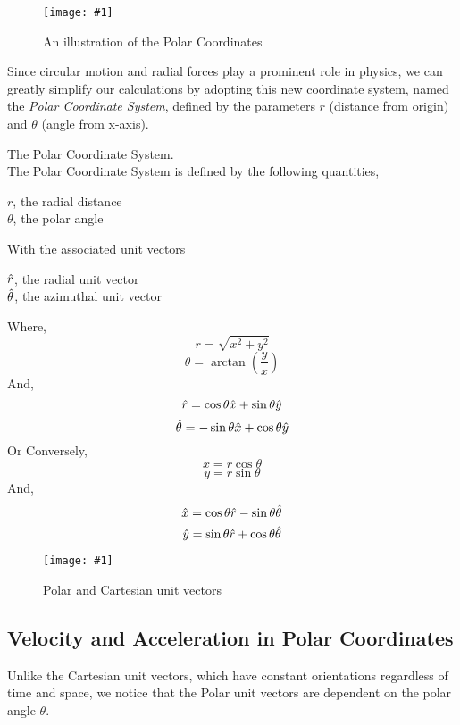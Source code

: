\documentclass[11pt]{article}
\newcommand{\fig}[4]{
    \begin{figure}[H]
        \centering
        \texttt{[image: \#1]}
        \caption{#2}
        \label{exp4fit}
    \end{figure}
}
\theoremstyle{gangnamstyle}{\newtheorem{definition}{Definition}[]}
\theoremstyle{gangnamstyle}{\newtheorem{example}{Example}[]}
\theoremstyle{gangnamstyle}{\newtheorem{problem}{Problem}[]}
\begin{document}
\fig{figs/n0/polar.jpg}{An illustration of the Polar Coordinates}{0.1}{0}

Since circular motion and radial forces play a prominent role in physics, we can greatly simplify our calculations by adopting this new coordinate system, named the \textit{Polar Coordinate System}, defined by the parameters $r$ (distance from origin) and $\theta$ (angle from x-axis). 

\begin{definition}
The Polar Coordinate System. \\
The Polar Coordinate System is defined by the following quantities, 
\begin{center}
    $r$, the radial distance \\
    $\theta$, the polar angle
\end{center}
With the associated unit vectors 
\begin{center}
    $\Hat{r}$, the radial unit vector \\
    $\Hat{\theta}$, the azimuthal unit vector
\end{center}
Where, 
\begin{equation}
    r = \sqrt{x^2 + y^2}
\end{equation}
\begin{equation}
    \theta = \arctan(\frac{y}{x})
\end{equation}
And, 
\begin{equation}
    \Hat{r} = \cos\theta\Hat{x} + \sin\theta\Hat{y}
\end{equation}
\begin{equation}
    \Hat{\theta} = -\sin\theta\Hat{x} + \cos\theta\Hat{y}
\end{equation}
Or Conversely, 
\begin{equation}
    x = r\cos\theta
\end{equation}
\begin{equation}
    y = r\sin\theta
\end{equation}
And, 
\begin{equation}
    \Hat{x} = \cos\theta\Hat{r} - \sin\theta\Hat{\theta}
\end{equation}
\begin{equation}
    \Hat{y} = \sin\theta\Hat{r} + \cos\theta\Hat{\theta}
\end{equation}
\end{definition}

\fig{figs/n0/unit-vectors.jpg}{Polar and Cartesian unit vectors}{0.1}{0}

\subsection{Velocity and Acceleration in Polar Coordinates}
Unlike the Cartesian unit vectors, which have constant orientations regardless of time and space, we notice that the Polar unit vectors are dependent on the polar angle $\theta$. 
\end{document}
